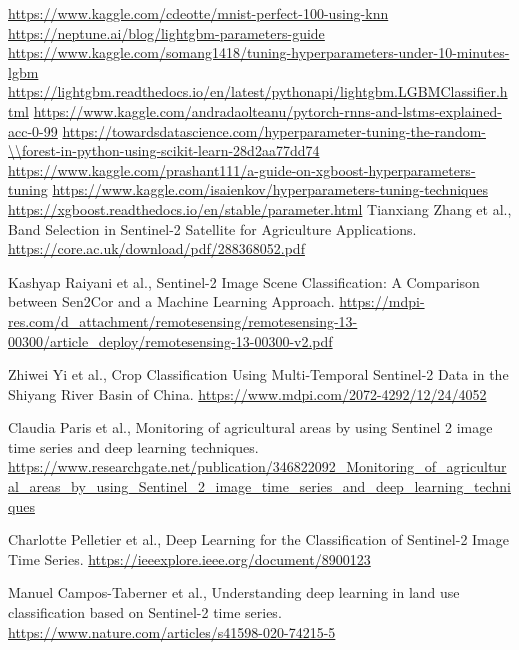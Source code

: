 \documentclass{article}
\begin{document}
\begin{thebibliography}{99}  
   \url{https://www.kaggle.com/cdeotte/mnist-perfect-100-using-knn}
   \url{https://neptune.ai/blog/lightgbm-parameters-guide}
   \url{https://www.kaggle.com/somang1418/tuning-hyperparameters-under-10-minutes-lgbm}
   \url{https://lightgbm.readthedocs.io/en/latest/pythonapi/lightgbm.LGBMClassifier.html}
   \url{https://www.kaggle.com/andradaolteanu/pytorch-rnns-and-lstms-explained-acc-0-99}
   \url{https://towardsdatascience.com/hyperparameter-tuning-the-random-\\forest-in-python-using-scikit-learn-28d2aa77dd74}
   \url{https://www.kaggle.com/prashant111/a-guide-on-xgboost-hyperparameters-tuning}
   \url{https://www.kaggle.com/isaienkov/hyperparameters-tuning-techniques}
   \url{https://xgboost.readthedocs.io/en/stable/parameter.html}
  Tianxiang Zhang et al., Band Selection in Sentinel-2 Satellite for Agriculture Applications. \url{https://core.ac.uk/download/pdf/288368052.pdf}

  Kashyap Raiyani et al., Sentinel-2 Image Scene Classification: A Comparison between
  Sen2Cor and a Machine Learning Approach. \url{https://mdpi-res.com/d_attachment/remotesensing/remotesensing-13-00300/article_deploy/remotesensing-13-00300-v2.pdf}

  Zhiwei Yi et al., Crop Classification Using Multi-Temporal Sentinel-2 Data in the Shiyang River Basin of China. \url{https://www.mdpi.com/2072-4292/12/24/4052}

  Claudia Paris et al., Monitoring of agricultural areas by using Sentinel 2 image time series and deep learning techniques. \url{https://www.researchgate.net/publication/346822092_Monitoring_of_agricultural_areas_by_using_Sentinel_2_image_time_series_and_deep_learning_techniques}

  Charlotte Pelletier et al., Deep Learning for the Classification of Sentinel-2 Image Time Series. 
  \url{https://ieeexplore.ieee.org/document/8900123}

Manuel Campos-Taberner et al., Understanding deep learning in land use classification based on Sentinel-2 time series. \url{https://www.nature.com/articles/s41598-020-74215-5}
\end{thebibliography}
\end{document}
